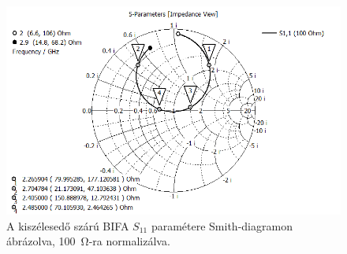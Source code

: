 \begin{figure}[h!]
	\centering
	\includegraphics[width=\textwidth]{kep/results/bifa_broadband_S11_smith.png}
	\caption{A kiszélesedő szárú BIFA $S_{11}$ paramétere Smith-diagramon ábrázolva, \SI{100}{\ohm}-ra normalizálva.}
	\label{fig:smith}
\end{figure}
